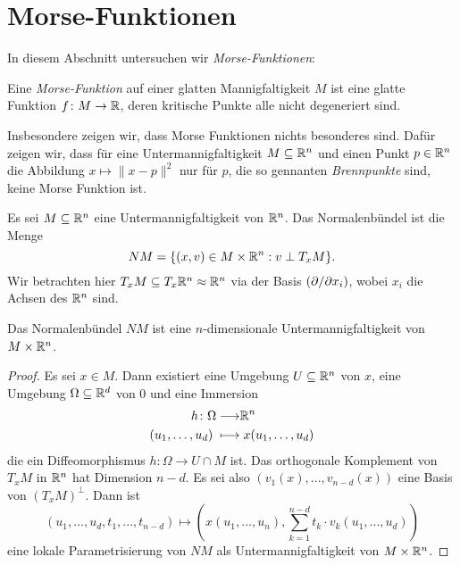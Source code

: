 \section{Morse-Funktionen}

In diesem Abschnitt untersuchen wir \textit{Morse-Funktionen}:

\begin{definition}
    \label{satz: morse-funktion}
    Eine \textit{Morse-Funktion} auf einer glatten Mannigfaltigkeit $M$ ist eine glatte Funktion
    $f \colon M \to { \mathbb R }$, deren kritische Punkte alle nicht degeneriert sind.
\end{definition}

Insbesondere zeigen wir, dass Morse Funktionen nichts besonderes sind. Dafür zeigen wir, dass für 
eine Untermannigfaltigkeit $M \subseteq { \mathbb R }^n$ und einen Punkt $p \in { \mathbb R }^n$ die Abbildung
$x \mapsto \| x - p \|^2$ nur für $p$, die so gennanten \textit{Brennpunkte}
sind, keine Morse Funktion ist.

\begin{definition}[Normalenbündel]
    \label{def: normalenbuendel}
    Es sei $M \subseteq { \mathbb R }^n$ eine Untermannigfaltigkeit von ${ \mathbb R }^n$. Das Normalenbündel ist die 
    Menge
    \[ NM = \{ (x, v) \in M \times { \mathbb R }^n : v \perp T_xM \} . \]
    Wir betrachten hier $T_xM \subseteq T_x{ \mathbb R }^n \approx { \mathbb R }^n$ via der Basis 
    $\left( { \partial } / { \partial } x_i \right)$, wobei $x_i$ die Achsen des ${ \mathbb R }^n$ sind.
\end{definition}

\begin{prop}
    \label{prop: NM ist untermannigfaltigkeit}
    Das Normalenbündel $NM$ ist eine $n$-dimensionale Untermannigfaltigkeit von $M \times { \mathbb R }^n$.
\end{prop}

\begin{proof}
    Es sei $x \in M$. Dann existiert eine Umgebung $U \subseteq { \mathbb R }^n$ von $x$, eine Umgebung 
    $\Omega \subseteq { \mathbb R }^d$ von $0$ und eine Immersion 
    \begin{align*}
        h \colon \Omega \longrightarrow & { \mathbb R }^n \\
        (u_1, \dots, u_d) \; \longmapsto & \; x(u_1, \dots, u_d)
    \end{align*}
    die ein Diffeomorphismus $h \colon \Omega \to U \cap M$ ist. Das orthogonale Komplement 
    von $T_xM$ in ${ \mathbb R }^n$ hat Dimension $n - d$. Es sei also 
    $(v_1(x), ..., v_{n-d}(x))$ eine Basis von $(T_xM)^{\perp}$. Dann ist 
    \[ (u_1, ..., u_d, t_1, ..., t_{n - d}) \longmapsto 
        \left(x(u_1, ..., u_n), \sum_{k = 1}^{n - d} t_k \cdot v_k(u_1, ..., u_d)\right) \]
    eine lokale Parametrisierung von $NM$ als Untermannigfaltigkeit von $M \times { \mathbb R }^n$.
\end{proof}


